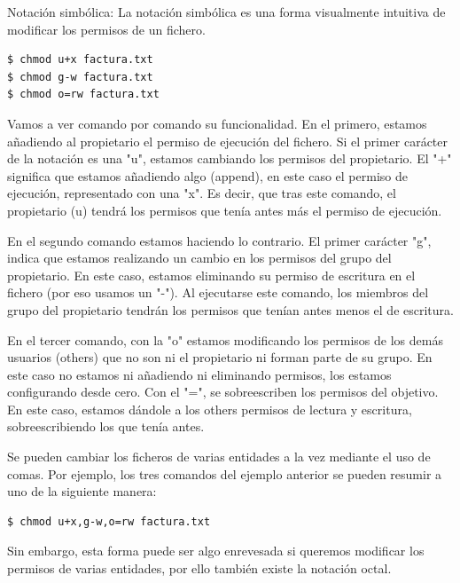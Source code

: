 Notación simbólica: La notación simbólica es una forma visualmente intuitiva de modificar los permisos de un fichero.

\begin{tcolorbox-code}
\begin{lstlisting}
$ chmod u+x factura.txt
$ chmod g-w factura.txt
$ chmod o=rw factura.txt
\end{lstlisting}
\end{tcolorbox-code}

Vamos a ver comando por comando su funcionalidad. En el primero, estamos añadiendo al propietario el permiso de ejecución del fichero. Si el primer carácter de la notación es una "u", estamos cambiando los permisos del propietario. El "+" significa que estamos añadiendo algo (append), en este caso el permiso de ejecución, representado con una "x". Es decir, que tras este comando, el propietario (u) tendrá los permisos que tenía antes más el permiso de ejecución.

En el segundo comando estamos haciendo lo contrario. El primer carácter "g", indica que estamos realizando un cambio en los permisos del grupo del propietario. En este caso, estamos eliminando su permiso de escritura en el fichero (por eso usamos un "-"). Al ejecutarse este comando, los miembros del grupo del propietario tendrán los permisos que tenían antes menos el de escritura.

En el tercer comando, con la "o" estamos modificando los permisos de los demás usuarios (others) que no son ni el propietario ni forman parte de su grupo. En este caso no estamos ni añadiendo ni eliminando permisos, los estamos configurando desde cero. Con el "=", se sobreescriben los permisos del objetivo. En este caso, estamos dándole a los others permisos de lectura y escritura, sobreescribiendo los que tenía antes.

Se pueden cambiar los ficheros de varias entidades a la vez mediante el uso de comas. Por ejemplo, los tres comandos del ejemplo anterior se pueden resumir a uno de la siguiente manera:

\begin{tcolorbox-code}
\begin{lstlisting}
$ chmod u+x,g-w,o=rw factura.txt
\end{lstlisting}
\end{tcolorbox-code}

Sin embargo, esta forma puede ser algo enrevesada si queremos modificar los permisos de varias entidades, por ello también existe la notación octal.

